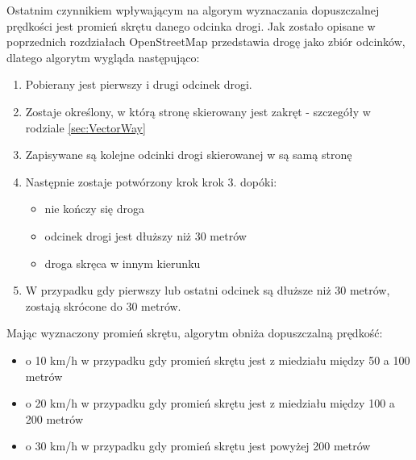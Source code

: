 Ostatnim czynnikiem wpływającym na algorym wyznaczania dopuszczalnej prędkości jest promień skrętu danego odcinka drogi. Jak zostało opisane w poprzednich rozdziałach OpenStreetMap przedstawia drogę jako zbiór odcinków, dlatego algorytm wygląda następująco:
\begin{enumerate}
\item Pobierany jest pierwszy i drugi odcinek drogi.
\item Zostaje określony, w którą stronę skierowany jest zakręt - szczegóły w rodziale \ref{sec:VectorWay}
\item Zapisywane są kolejne odcinki drogi skierowanej w są samą stronę
\item Następnie zostaje potwórzony krok krok 3. dopóki:
\begin{itemize}
\item nie kończy się droga
\item odcinek drogi jest dłuższy niż 30 metrów
\item droga skręca w innym kierunku
\end{itemize} 
\item W przypadku gdy pierwszy lub ostatni odcinek są dłuższe niż 30 metrów, zostają skrócone do 30 metrów.
\end{enumerate}

Mając wyznaczony promień skrętu, algorytm obniża dopuszczalną prędkość:
\begin{itemize}
\item o 10 km/h w przypadku gdy promień skrętu jest z miedziału między 50 a 100 metrów
\item o 20 km/h w przypadku gdy promień skrętu jest z miedziału między 100 a 200 metrów
\item o 30 km/h w przypadku gdy promień skrętu jest powyżej 200 metrów
\end{itemize}


